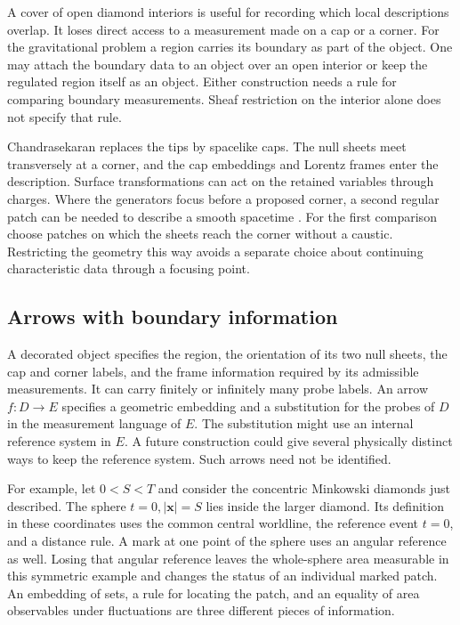 \documentclass[11pt,letterpaper]{article}
\begin{document}
A cover of open diamond interiors is useful for recording which local descriptions overlap. It loses direct access to a measurement made on a cap or a corner. For the gravitational problem a region carries its boundary as part of the object. One may attach the boundary data to an object over an open interior or keep the regulated region itself as an object. Either construction needs a rule for comparing boundary measurements. Sheaf restriction on the interior alone does not specify that rule.

Chandrasekaran replaces the tips by spacelike caps. The null sheets meet transversely at a corner, and the cap embeddings and Lorentz frames enter the description. Surface transformations can act on the retained variables through charges. Where the generators focus before a proposed corner, a second regular patch can be needed to describe a smooth spacetime \cite[Sec.~3, Figs.~7--10]{nc}. For the first comparison choose patches on which the sheets reach the corner without a caustic. Restricting the geometry this way avoids a separate choice about continuing characteristic data through a focusing point.

\subsection{Arrows with boundary information}

A decorated object specifies the region, the orientation of its two null sheets, the cap and corner labels, and the frame information required by its admissible measurements. It can carry finitely or infinitely many probe labels. An arrow $f:D\to E$ specifies a geometric embedding and a substitution for the probes of $D$ in the measurement language of $E$. The substitution might use an internal reference system in $E$. A future construction could give several physically distinct ways to keep the reference system. Such arrows need not be identified.

For example, let $0<S<T$ and consider the concentric Minkowski diamonds just described. The sphere $t=0,|\boldsymbol x|=S$ lies inside the larger diamond. Its definition in these coordinates uses the common central worldline, the reference event $t=0$, and a distance rule. A mark at one point of the sphere uses an angular reference as well. Losing that angular reference leaves the whole-sphere area measurable in this symmetric example and changes the status of an individual marked patch. An embedding of sets, a rule for locating the patch, and an equality of area observables under fluctuations are three different pieces of information.
\end{document}
